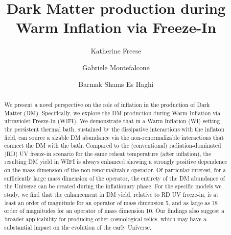\documentclass[notitlepage,nofootinbib,preprintnumbers,aps,superscriptaddress,twocolumn]{revtex4-1}
\newcommand{\detailtexcount}[1]{%
  \immediate\write18{texcount -merge -sum -q #1.tex output.bbl > #1.wcdetail }%
}
\begin{document}
\title{Dark Matter production during Warm Inflation via Freeze-In}
\author{Katherine Freese}
\author{Gabriele Montefalcone}
\author{Barmak Shams Es Haghi}


\begin{abstract}

We present a novel perspective on the role of inflation in the  production of Dark Matter (DM). Specifically, we explore the DM production during Warm Inflation via ultraviolet Freeze-In (WIFI). We demonstrate that in a Warm Inflation (WI) setting the persistent thermal bath, sustained by the dissipative interactions with the inflaton field, can source a sizable DM abundance via the non-renormalizable  interactions that connect the DM with the bath. Compared to the (conventional) radiation-dominated (RD) UV freeze-in scenario for the same reheat temperature (after inflation), the resulting DM yield in WIFI is always enhanced showing a strongly positive dependence on the mass dimension of the non-renormalizable operator. 
Of particular interest, for a sufficiently large mass dimension of the operator, the entirety of the DM abundance of the Universe can be  created during the inflationary phase.  For the specific models we study, we find  that the enhancement in DM yield, relative to RD UV freeze-in, is at least an order of magnitude for an operator of mass dimension 5, and as large as 18 order of magnitudes for an operator of mass dimension 10.  %
Our findings also suggest a broader applicability for producing other cosmological relics, which may have a substantial impact on the evolution of the early Universe.
\end{abstract}
 
\end{document}
